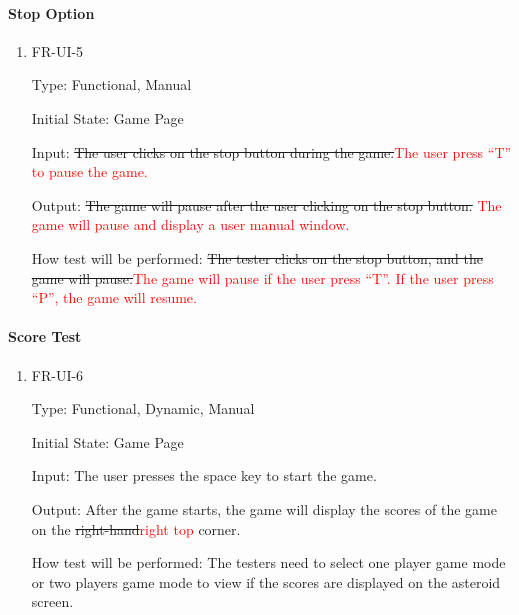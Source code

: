 \documentclass[12pt, titlepage]{article}
\begin{document}
\paragraph{Stop Option}
\begin{enumerate}					
\item{FR-UI-5\\}

Type: Functional, Manual
					
Initial State: Game Page
					
Input: \sout{The user clicks on the stop button during the game.}\textcolor{red}{The user press “T” to pause the game.
}
					
Output: \sout{The game will pause after the user clicking on the stop button. }\textcolor{red}{The game will pause and display a user manual
window.
} 
					
How test will be performed: \sout{The tester clicks on the stop button, and the game will pause.}\textcolor{red}{The game will pause if the user press
“T”. If the user press “P”, the game will resume.}

\end{enumerate}

\paragraph{Score Test}
\begin{enumerate}					
\item{FR-UI-6\\}

Type: Functional, Dynamic, Manual
					
Initial State: Game Page
					
Input: The user presses the space key to start the game.
					
Output: After the game starts, the game will display the scores of the game on the \sout{right-hand}\textcolor{red}{right top }corner.
					
How test will be performed:  The testers need to select one player game mode or two players game mode to view if the scores are displayed on the asteroid screen.
\end{enumerate}
\end{document}
